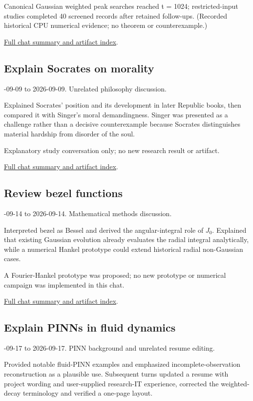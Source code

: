 \documentclass[11pt]{article}
\begin{document}
\noindent Canonical Gaussian weighted peak searches reached t = 1024; restricted-input studies completed 40 screened records after retained follow-ups. (Recorded historical CPU numerical evidence; no theorem or counterexample.)

\nopagebreak[4]
\noindent\href{https://github.com/matasvai/dysthe-research-map/blob/codex/research-record-2026-11-05/research-record/2026-11-05/CHATS.md#chat-01a0873c-15b7-75f0-82de-dc5accfc01fa}{Full chat summary and artifact index}.
\subsection*{Explain Socrates on morality}
-09-09 to 2026-09-09. Unrelated philosophy discussion.\par
Explained Socrates' position and its development in later Republic books, then compared it with Singer's moral demandingness. Singer was presented as a challenge rather than a decisive counterexample because Socrates distinguishes material hardship from disorder of the soul.

\noindent Explanatory study conversation only; no new research result or artifact.

\nopagebreak[4]
\noindent\href{https://github.com/matasvai/dysthe-research-map/blob/codex/research-record-2026-11-05/research-record/2026-11-05/CHATS.md#chat-01a08902-30e9-7e13-ae48-caafc8c0b148}{Full chat summary and artifact index}.
\subsection*{Review bezel functions}
-09-14 to 2026-09-14. Mathematical methods discussion.\par
Interpreted bezel as Bessel and derived the angular-integral role of $J_0$. Explained that existing Gaussian evolution already evaluates the radial integral analytically, while a numerical Hankel prototype could extend historical radial non-Gaussian cases.

\noindent A Fourier-Hankel prototype was proposed; no new prototype or numerical campaign was implemented in this chat.

\nopagebreak[4]
\noindent\href{https://github.com/matasvai/dysthe-research-map/blob/codex/research-record-2026-11-05/research-record/2026-11-05/CHATS.md#chat-01a0a172-45ad-7db2-95de-fc977a7ffb68}{Full chat summary and artifact index}.
\subsection*{Explain PINNs in fluid dynamics}
-09-17 to 2026-09-17. PINN background and unrelated resume editing.\par
Provided notable fluid-PINN examples and emphasized incomplete-observation reconstruction as a plausible use. Subsequent turns updated a resume with project wording and user-supplied research-IT experience, corrected the weighted-decay terminology and verified a one-page layout.
\end{document}
